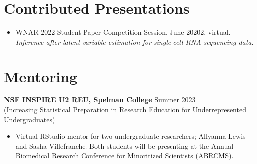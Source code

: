 \documentclass[margin, 10pt]{res}
\begin{document}
\begin{resume}
\section{Contributed Presentations} 
\begin{itemize}
\item WNAR 2022 Student Paper Competition Session, June 20202, virtual. \emph{Inference after latent variable estimation for single cell RNA-sequencing data}.
\end{itemize}

\section{Mentoring}
{\textbf{NSF INSPIRE U2 REU, Spelman College}} \hfill Summer 2023 \\
(Increasing Statistical Preparation in Research Education for Underrepresented Undergraduates)
\begin{itemize}
\item Virtual RStudio mentor for two undergraduate researchers; 
Allyanna Lewis and Sasha Villefranche. Both students will be presenting at the Annual Biomedical Research Conference for Minoritized Scientists (ABRCMS). 
\end{itemize}


\end{resume}
\end{document}
